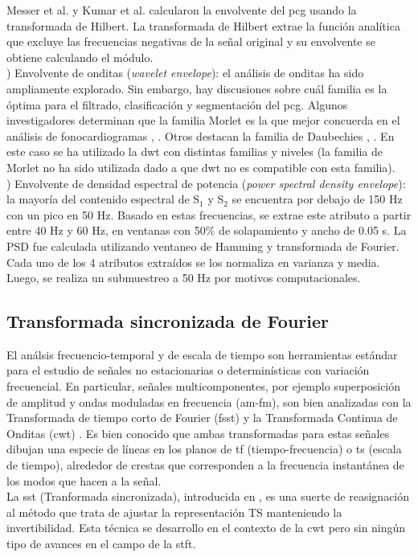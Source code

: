     Messer et al. \cite{ref:messer} y Kumar et al. \cite{ref:kumar} calcularon la envolvente del \acrshort{pcg} usando la transformada de Hilbert. La transformada de Hilbert extrae la función analítica que excluye las frecuencias negativas de la señal original y su envolvente se obtiene calculando el módulo. \\
) Envolvente de onditas (\textit{wavelet envelope}): el análisis de onditas ha sido ampliamente explorado. Sin embargo, hay discusiones sobre cuál familia es la óptima para el filtrado, clasificación y segmentación del \acrshort{pcg}. Algunos investigadores determinan que la familia Morlet es la que mejor concuerda en el análisis de fonocardiogramas \cite{ ref:oskiper-watrous}, \cite{ref:ergen-tatar-gulcur}. Otros destacan la familia de Daubechies \cite{ref:liang-sakari-iiro}, \cite{ref:gupta}. En este caso se ha utilizado la \acrshort{dwt} con distintas familias y niveles (la familia de Morlet no ha sido utilizada dado a que \acrshort{dwt} no es compatible con esta familia). \\
) Envolvente de densidad espectral de potencia (\textit{power spectral density envelope}): la mayoría del contenido espectral de S$_1$ y S$_2$ se encuentra por debajo de 150 Hz con un pico en 50 Hz. Basado en estas frecuencias, se extrae este atributo a partir entre 40 Hz y 60 Hz, en ventanas con 50\% de solapamiento y ancho de 0.05 s. La PSD fue calculada utilizando ventaneo de Hamming y transformada de Fourier. \\
\indent Cada uno de los 4 atributos extraídos se los normaliza en varianza y media. Luego, se realiza un submuestreo a 50 Hz por motivos computacionales.

\subsection*{Transformada sincronizada de Fourier}

El análsis frecuencio-temporal y de escala de tiempo son herramientas estándar para el estudio de señales no estacionarias o determinísticas con variación frecuencial. En particular, señales multicomponentes, por ejemplo superposición de amplitud y ondas moduladas en frecuencia (\acrshort{am}-\acrshort{fm}), son bien analizadas con la Transformada de tiempo corto de Fourier (\acrshort{fsst}) \cite{ref:gabor} y la Transformada Continua de Onditas (\acrshort{cwt}) \cite{ref:grossmann-morlet}. Es bien conocido que ambas transformadas para estas señales dibujan una especie de líneas en los planos de \acrshort{tf} (tiempo-frecuencia) o \acrshort{ts} (escala de tiempo), alrededor de crestas que corresponden a la frecuencia instantánea de los modos que hacen a la señal. \\
\indent La \acrshort{sst} (Tranformada sincronizada), introducida en \cite{ref:daubechies-maes}, es una suerte de reasignación al método que trata de ajustar la representación TS manteniendo la invertibilidad. Esta técnica se desarrollo en el contexto de la \acrshort{cwt} pero sin ningún tipo de avances en el campo de la \acrshort{stft}.

